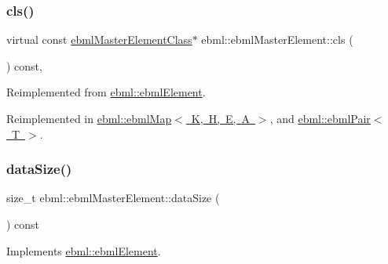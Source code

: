 \subsubsection{\texorpdfstring{cls()}{cls()}}
{\footnotesize\ttfamily virtual const \mbox{\hyperlink{classebml_1_1ebmlMasterElementClass}{ebml\+Master\+Element\+Class}}$\ast$ ebml\+::ebml\+Master\+Element\+::cls (\begin{DoxyParamCaption}{ }\end{DoxyParamCaption}) const\hspace{0.3cm}{\ttfamily [protected]}, {\ttfamily [virtual]}}



Reimplemented from \mbox{\hyperlink{classebml_1_1ebmlElement_a15cf59e94b01e2c49ec96512b9bd9d90}{ebml\+::ebml\+Element}}.



Reimplemented in \mbox{\hyperlink{classebml_1_1ebmlMap_a44f835be40d70d8425b8e08fbe0ce77f}{ebml\+::ebml\+Map$<$ K, H, E, A $>$}}, and \mbox{\hyperlink{classebml_1_1ebmlPair_ad1244458e1390cbf567dfd460b0002f2}{ebml\+::ebml\+Pair$<$ T $>$}}.

\mbox{\label{classebml_1_1ebmlMasterElement_ae396f9a2f9e0e86b7f6d20505b88352c}} 
\subsubsection{\texorpdfstring{data\+Size()}{dataSize()}}
{\footnotesize\ttfamily size\+\_\+t ebml\+::ebml\+Master\+Element\+::data\+Size (\begin{DoxyParamCaption}{ }\end{DoxyParamCaption}) const\hspace{0.3cm}{\ttfamily [virtual]}}



Implements \mbox{\hyperlink{classebml_1_1ebmlElement_a47ed4167d9c69104e02b6dbad0cd1fef}{ebml\+::ebml\+Element}}.

\mbox{\label{classebml_1_1ebmlMasterElement_a2016b30a9ac7d48e990a6a864138a362}} 
